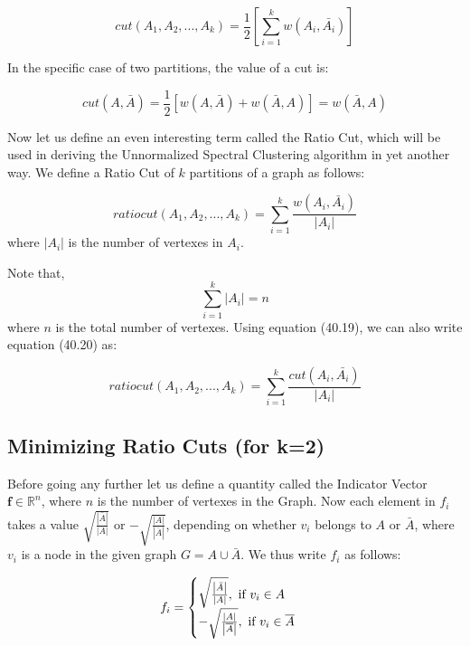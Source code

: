 \documentclass[english]{article}
\theoremstyle{plain}
\begin{document}
\begin{equation}
cut(A_{1}, A_{2},...,A_{k}) = \frac{1}{2} \left[ \sum_{i=1}^{k} w(A_{i},\bar{A_{i}}) \right]
\end{equation}

In the specific case of two partitions, the value of a cut is:

\begin{equation}
cut(A,\bar{A}) = \frac{1}{2} \left[w\left( A,\bar{A} \right) + w\left( \bar{A},A \right) \right] = w\left( \bar{A},A \right)  
\end{equation}

Now let us define an even interesting term called the Ratio Cut, which will be used in deriving the Unnormalized Spectral Clustering algorithm in yet another way. 
We define a Ratio Cut of $k$ partitions of a graph as follows:

\begin{equation}
ratio cut(A_{1},A_{2},...,A_{k}) =  \sum_{i=1}^{k} \frac{w\left( A_{i},\bar{A_{i}} \right) }{\left|A_{i}\right|} 
\end{equation}
where $\left|A_{i}\right|$ is the number of vertexes in $A_{i}$. 

Note that, \begin{equation}
\sum_{i=1}^{k} \left|A_{i} \right| = n
\end{equation}
where $n$ is the total number of vertexes.
Using equation (40.19), we can also write equation (40.20) as:


\begin{equation}
ratio cut(A_{1},A_{2},...,A_{k}) =  \sum_{i=1}^{k} \frac{cut\left( A_{i},\bar{A_{i}} \right) }{\left|A_{i}\right|} 
\end{equation}

\subsection{Minimizing Ratio Cuts (for k=2)}

Before going any further let us define a quantity called the Indicator Vector $\boldsymbol{f} \in \mathbb{R}^{n}$, where $n$ is the number of vertexes in the Graph. Now each element in $f_{i}$ takes a value $\sqrt{\frac{\left| \bar{A} \right|}{\left| A \right|}}$ or $-\sqrt{\frac{\left| A \right|}{\left| \overline{A} \right|}}$, depending on whether $v_{i}$ belongs to $A$ or $\bar{A}$, where $v_{i}$ is a node in the given graph $G = A \cup \bar{A}$. We thus write $f_{i}$ as follows:

\begin{equation}
f_{i} = 
\begin{cases}
\sqrt{\frac{\left| \bar{A} \right|}{\left| A \right|}}, \textnormal{ if } v_{i} \in A \\
-\sqrt{\frac{\left| A \right|}{\left| \overline{A} \right|}}, \textnormal{ if } v_{i} \in \overline{A}
\end{cases}
\end{equation}
\end{document}
